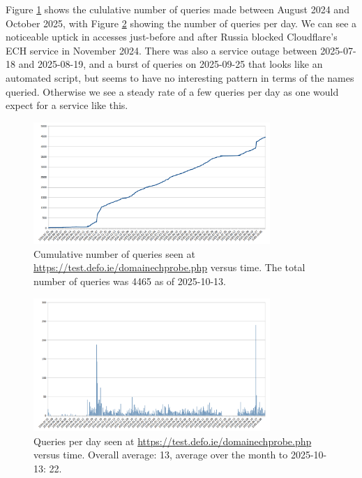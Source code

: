 Figure \ref{fig:qtimes2} shows the cululative number of queries made between
August 2024 and October 2025, with Figure \ref{fig:cpd} showing the number of queries
per day.  We can see a noticeable uptick in accesses just-before and after
Russia blocked Cloudflare's ECH service in November 2024.  There was also a
service outage between 2025-07-18 and 2025-08-19, and a burst of queries on
2025-09-25 that looks like an automated script, but seems to have no
interesting pattern in terms of the names queried. Otherwise we see a steady
rate of a few queries per day as one would expect for a service like this.

\begin{figure}
	\centering
	\includegraphics[width=0.8\textwidth,keepaspectratio]{domainprobequeries2.png}
		\caption[clustediag]{Cumulative number of queries seen at 
        \url{https://test.defo.ie/domainechprobe.php} versus time. 
        The total number of queries was 4465 as of 2025-10-13.} 
	\label{fig:qtimes2}
\end{figure}

\begin{figure}
	\centering
	\includegraphics[width=0.8\textwidth,keepaspectratio]{cpd.png}
		\caption[clustediag]{Queries per day seen at 
        \url{https://test.defo.ie/domainechprobe.php} versus time.
             Overall average: 13, average over the month to 2025-10-13: 22.}
	\label{fig:cpd}
\end{figure}

